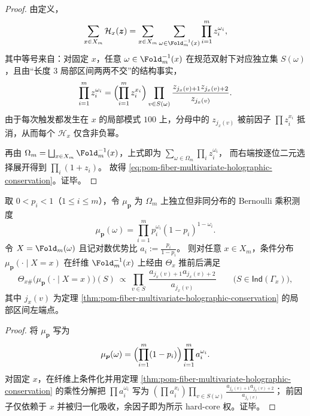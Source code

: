 \begin{proof}
由定义，
\[
\sum_{x\in X_m}\mathcal H_x(\boldsymbol{z})
=\sum_{x\in X_m}\sum_{\omega\in\Fold_m^{-1}(x)}\prod_{i=1}^{m}z_i^{\omega_i},
\]
其中等号来自：对固定 \(x\)，任意 \(\omega\in\Fold_m^{-1}(x)\) 在规范双射下对应独立集 \(S(\omega)\)，且由“长度 \(3\) 局部区间两两不交”的结构事实，
\[
\prod_{i=1}^{m}z_i^{\omega_i}
=\Bigl(\prod_{i=1}^{m}z_i^{x_i}\Bigr)\prod_{v\in S(\omega)}\frac{z_{j_x(v)+1}z_{j_x(v)+2}}{z_{j_x(v)}}.
\]
由于每次触发都发生在 \(x\) 的局部模式 \(100\) 上，分母中的 \(z_{j_x(v)}\) 被前因子 \(\prod z_i^{x_i}\) 抵消，从而每个 \(\mathcal H_x\) 仅含非负幂。
\par
再由 \(\Omega_m=\bigsqcup_{x\in X_m}\Fold_m^{-1}(x)\)，上式即为
\(
\sum_{\omega\in\Omega_m}\prod_i z_i^{\omega_i}
\)，
而右端按逐位二元选择展开得到 \(\prod_i(1+z_i)\)。
故得 \eqref{eq:pom-fiber-multivariate-holographic-conservation}。证毕。
\end{proof}





\begin{corollary}\label{cor:pom-fiber-inhom-bernoulli-posterior-hardcore}
取 \(0<p_i<1\)（\(1\le i\le m\)），令 \(\mu_{\boldsymbol p}\) 为 \(\Omega_m\) 上独立但非同分布的 Bernoulli 乘积测度
\[
\mu_{\boldsymbol p}(\omega)=\prod_{i=1}^{m}p_i^{\omega_i}(1-p_i)^{1-\omega_i}.
\]
令 \(X=\Fold_m(\omega)\) 且记对数优势比 \(a_i:=\frac{p_i}{1-p_i}\)。
则对任意 \(x\in X_m\)，条件分布 \(\mu_{\boldsymbol p}(\cdot\mid X=x)\) 在纤维 \(\Fold_m^{-1}(x)\) 上经由 \(\Theta_x\) 推前后满足
\[
\Theta_{x\#}\bigl(\mu_{\boldsymbol p}(\cdot\mid X=x)\bigr)(S)
\ \propto\
\prod_{v\in S}\ \frac{a_{j_x(v)+1}a_{j_x(v)+2}}{a_{j_x(v)}}
\qquad\bigl(S\in\mathsf{Ind}(\Gamma_x)\bigr),
\]
其中 \(j_x(v)\) 为定理 \ref{thm:pom-fiber-multivariate-holographic-conservation} 的局部区间左端点。
\end{corollary}

\begin{proof}
将 \(\mu_{\boldsymbol p}\) 写为
\[
\mu_{\boldsymbol p}(\omega)=\Bigl(\prod_{i=1}^{m}(1-p_i)\Bigr)\prod_{i=1}^{m}a_i^{\omega_i}.
\]
对固定 \(x\)，在纤维上条件化并用定理 \ref{thm:pom-fiber-multivariate-holographic-conservation} 的乘性分解把 \(\prod a_i^{\omega_i}\) 写为
\(
(\prod a_i^{x_i})\prod_{v\in S(\omega)}\frac{a_{j_x(v)+1}a_{j_x(v)+2}}{a_{j_x(v)}}
\)；
前因子仅依赖于 \(x\) 并被归一化吸收，余因子即为所示 hard-core 权。证毕。
\end{proof}

